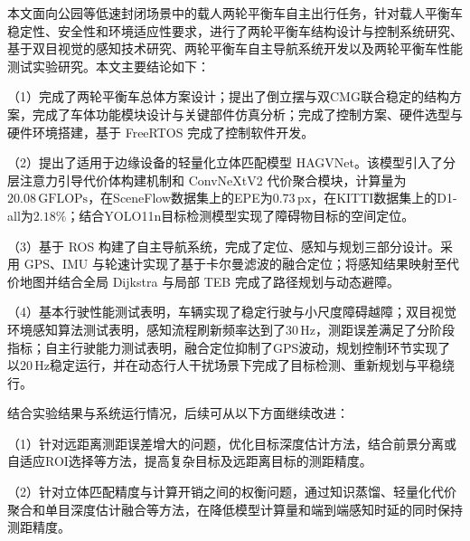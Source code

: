 \begin{conclusions}
本文面向公园等低速封闭场景中的载人两轮平衡车自主出行任务，针对载人平衡车稳定性、安全性和环境适应性要求，进行了两轮平衡车结构设计与控制系统研究、基于双目视觉的感知技术研究、两轮平衡车自主导航系统开发以及两轮平衡车性能测试实验研究。本文主要结论如下：

（1）完成了两轮平衡车总体方案设计；提出了倒立摆与双CMG联合稳定的结构方案，完成了车体功能模块设计与关键部件仿真分析；完成了控制方案、硬件选型与硬件环境搭建，基于 FreeRTOS 完成了控制软件开发。

（2）提出了适用于边缘设备的轻量化立体匹配模型 HAGVNet。该模型引入了分层注意力引导代价体构建机制和 ConvNeXtV2 代价聚合模块，计算量为$20.08\,\mathrm{GFLOPs}$，在SceneFlow数据集上的EPE为$0.73\,\mathrm{px}$，在KITTI数据集上的D1-all为$2.18\%$；结合YOLO11n目标检测模型实现了障碍物目标的空间定位。

（3）基于 ROS 构建了自主导航系统，完成了定位、感知与规划三部分设计。采用 GPS、IMU 与轮速计实现了基于卡尔曼滤波的融合定位；将感知结果映射至代价地图并结合全局 Dijkstra 与局部 TEB 完成了路径规划与动态避障。

（4）基本行驶性能测试表明，车辆实现了稳定行驶与小尺度障碍越障；双目视觉环境感知算法测试表明，感知流程刷新频率达到了$30\,\mathrm{Hz}$，测距误差满足了分阶段指标；自主行驶能力测试表明，融合定位抑制了GPS波动，规划控制环节实现了以$20\,\mathrm{Hz}$稳定运行，并在动态行人干扰场景下完成了目标检测、重新规划与平稳绕行。

结合实验结果与系统运行情况，后续可从以下方面继续改进：

（1）针对远距离测距误差增大的问题，优化目标深度估计方法，结合前景分离或自适应ROI选择等方法，提高复杂目标及远距离目标的测距精度。

（2）针对立体匹配精度与计算开销之间的权衡问题，通过知识蒸馏、轻量化代价聚合和单目深度估计融合等方法，在降低模型计算量和端到端感知时延的同时保持测距精度。
\end{conclusions}
